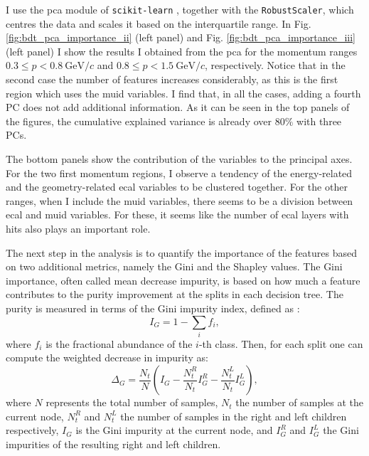 I use the \gls{pca} module of \texttt{scikit-learn} \cite{scikit-learn}, together with the \texttt{RobustScaler}, which centres the data and scales it based on the interquartile range. In Fig. \ref{fig:bdt_pca_importance_ii} (left panel) and Fig. \ref{fig:bdt_pca_importance_iii} (left panel) I show the results I obtained from the \gls{pca} for the momentum ranges $0.3 \leq p < 0.8 ~ \mathrm{GeV}/c$ and $0.8 \leq p < 1.5 ~ \mathrm{GeV}/c$, respectively. Notice that in the second case the number of features increases considerably, as this is the first region which uses the \gls{muid} variables. I find that, in all the cases, adding a fourth PC does not add additional information. As it can be seen in the top panels of the figures, the cumulative explained variance is already over $80\%$ with three PCs.

The bottom panels show the contribution of the variables to the principal axes. For the two first momentum regions, I observe a tendency of the energy-related and the geometry-related \gls{ecal} variables to be clustered together. For the other ranges, when I include the \gls{muid} variables, there seems to be a division between \gls{ecal} and \gls{muid} variables. For these, it seems like the number of \gls{ecal} layers with hits also plays an important role.

The next step in the analysis is to quantify the importance of the features based on two additional metrics, namely the Gini and the Shapley values. The Gini importance, often called mean decrease impurity, is based on how much a feature contributes to the purity improvement at the splits in each decision tree. The purity is measured in terms of the Gini impurity index, defined as \cite{Jost2006}:
\begin{equation}
	I_{G} = 1 - \sum_{i} f_{i},
\end{equation}
where $f_{i}$ is the fractional abundance of the $i$-th class. Then, for each split one can compute the weighted decrease in impurity as:
\begin{equation}
	\Delta_{G} = \frac{N_{t}}{N} \left(I_{G} - \frac{N_{t}^{R}}{N_{t}} I_{G}^{R} - \frac{N_{t}^{L}}{N_{t}} I_{G}^{L}\right),
\end{equation}
where $N$ represents the total number of samples, $N_{t}$ the number of samples at the current node, $N_{t}^{R}$ and $N_{t}^{L}$ the number of samples in the right and left children respectively, $I_{G}$ is the Gini impurity at the current node, and $I_{G}^{R}$ and $I_{G}^{L}$ the Gini impurities of the resulting right and left children.

